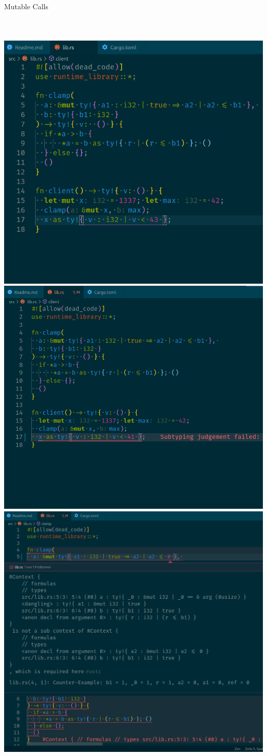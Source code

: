 \documentclass{sdqbeamer}
\begin{document}
\begin{frame}[fragile]{Mutable Calls}
  \begin{columns}
    \inputminted[]{rust}{./snippets/mut-arg-caller.rs}
    
  \end{columns}
\end{frame}



\begin{frame}
  \centering
   { \includegraphics[width=.5\textwidth]{../demo-1.png} }
   { \includegraphics[width=.5\textwidth]{../demo-2.png} }
   { \includegraphics[width=.5\textwidth]{../demo-3.png} }
\end{frame}
\end{document}
